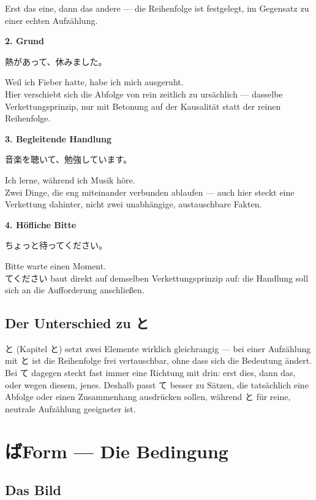 \documentclass[12pt]{book}
\begin{document}
Erst das eine, dann das andere — die Reihenfolge ist festgelegt, im Gegensatz zu einer echten Aufzählung.

\textbf{2. Grund}
\par\quad 熱があって、休みました。\\
\par\quad Weil ich Fieber hatte, habe ich mich ausgeruht.\\

Hier verschiebt sich die Abfolge von rein zeitlich zu ursächlich — dasselbe Verkettungsprinzip, nur mit Betonung auf der Kausalität statt der reinen Reihenfolge.

\textbf{3. Begleitende Handlung}
\par\quad 音楽を聴いて、勉強しています。\\
\par\quad Ich lerne, während ich Musik höre.\\

Zwei Dinge, die eng miteinander verbunden ablaufen — auch hier steckt eine Verkettung dahinter, nicht zwei unabhängige, austauschbare Fakten.

\textbf{4. Höfliche Bitte}
\par\quad ちょっと待ってください。\\
\par\quad Bitte warte einen Moment.\\

てください baut direkt auf demselben Verkettungsprinzip auf: die Handlung soll sich an die Aufforderung anschließen.

\section*{Der Unterschied zu と}

と (Kapitel と) setzt zwei Elemente wirklich gleichrangig — bei einer Aufzählung mit と ist die Reihenfolge frei vertauschbar, ohne dass sich die Bedeutung ändert. Bei て dagegen steckt fast immer eine Richtung mit drin: erst dies, dann das, oder wegen diesem, jenes. Deshalb passt て besser zu Sätzen, die tatsächlich eine Abfolge oder einen Zusammenhang ausdrücken sollen, während と für reine, neutrale Aufzählung geeigneter ist.


\chapter{ばForm — Die Bedingung}

\section*{Das Bild}
\end{document}
